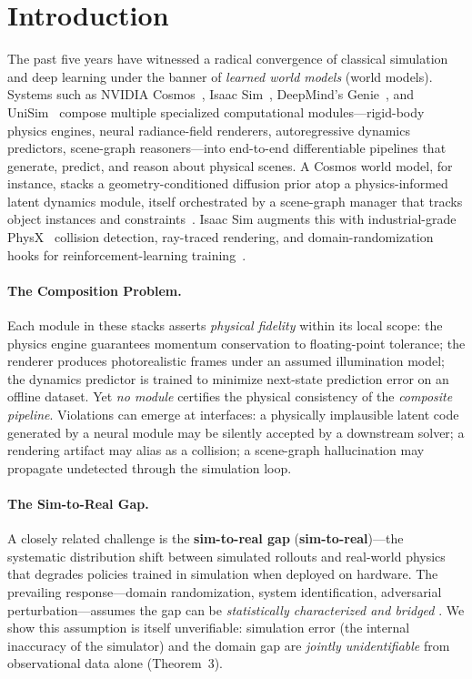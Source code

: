 \documentclass[11pt,twocolumn]{article}
\theoremstyle{definition}
\begin{document}
\section{Introduction}

The past five years have witnessed a radical convergence of classical
simulation and deep learning under the banner of \emph{learned world models}
(world models).  Systems such as NVIDIA Cosmos~\cite{cosmos2025},
Isaac Sim~\cite{isaacsim2023}, DeepMind's Genie~\cite{genie2024}, and
UniSim~\cite{unisim2023} compose multiple specialized computational
modules---rigid-body physics engines, neural radiance-field renderers,
autoregressive dynamics predictors, scene-graph reasoners---into end-to-end
differentiable pipelines that generate, predict, and reason about physical
scenes.  A Cosmos world model, for instance, stacks a geometry-conditioned
diffusion prior atop a physics-informed latent dynamics module, itself
orchestrated by a scene-graph manager that tracks object instances and
constraints~\cite{cosmos2025}.  Isaac Sim augments this with industrial-grade
PhysX~\cite{physx} collision detection, ray-traced rendering, and
domain-randomization hooks for reinforcement-learning training~\cite{isaacsim2023}.

\paragraph{The Composition Problem.}
Each module in these stacks asserts \emph{physical fidelity} within its local
scope: the physics engine guarantees momentum conservation to floating-point
tolerance; the renderer produces photorealistic frames under an assumed
illumination model; the dynamics predictor is trained to minimize
next-state prediction error on an offline dataset.  Yet \emph{no module}
certifies the physical consistency of the \emph{composite pipeline}.
Violations can emerge at interfaces: a physically implausible latent code
generated by a neural module may be silently accepted by a downstream solver;
a rendering artifact may alias as a collision; a scene-graph hallucination may
propagate undetected through the simulation loop.

\paragraph{The Sim-to-Real Gap.}
A closely related challenge is the \textbf{sim-to-real gap}
(\textbf{sim-to-real})---the systematic
distribution shift between simulated rollouts and real-world physics that
degrades policies trained in simulation when deployed on hardware.  The
prevailing response---domain randomization, system identification, adversarial
perturbation---assumes the gap can be \emph{statistically characterized and
bridged} \cite{tobin2017domain,peng2018sim}.  We show this assumption is
itself unverifiable: simulation error (the internal inaccuracy of the
simulator) and the domain gap are \emph{jointly unidentifiable} from
observational data alone (Theorem~3).
\end{document}
